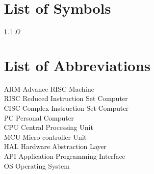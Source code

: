\listoffigures
\newpage\cleardoublepage

\listoftables

\chapter*{List of Symbols}
\label{listSym}
1.1 $\Omega$ 

\newpage\cleardoublepage

\chapter*{List of Abbreviations}
\label{listAbr}
ARM \Dotfill Advance RISC Machine
\\
RISC \Dotfill Reduced Instruction Set Computer 
\\
CISC \Dotfill Complex Instruction Set Computer 
\\
PC \Dotfill Personal Computer
\\
CPU \Dotfill Central Processing Unit
\\
MCU \Dotfill Micro-controller Unit
\\
HAL \Dotfill Hardware Abstraction Layer
\\
API \Dotfill Application Programming Interface
\\
OS \Dotfill Operating System
 

\newpage\cleardoublepage